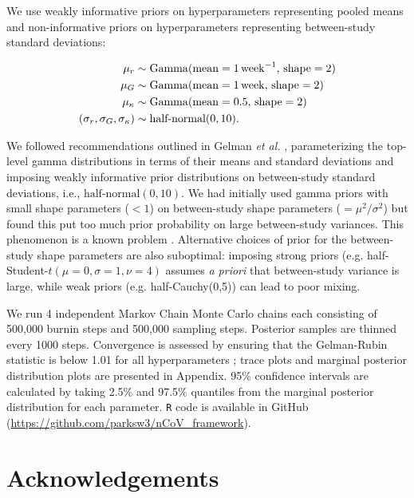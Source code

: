 \documentclass[12pt]{article}
\begin{document}
We use weakly informative priors on hyperparameters representing pooled means and non-informative priors on hyperparameters representing between-study standard deviations:
\begin{linenomath*}
\begin{equation}
\begin{aligned}
\mu_r &\sim \mathrm{Gamma}(\mathrm{mean}=1\,\mathrm{week}^{-1},\,\mathrm{shape}=2)\\
\mu_G &\sim \mathrm{Gamma}(\mathrm{mean}=1\,\mathrm{week},\,\mathrm{shape}=2)\\
\mu_\kappa &\sim \mathrm{Gamma}(\mathrm{mean}=0.5,\,\mathrm{shape}=2)\\
(\sigma_r, \sigma_G, \sigma_\kappa) &\sim \textrm{half-normal}(0, 10).
\end{aligned}
\end{equation}
\end{linenomath*}
We followed recommendations outlined in Gelman \textit{et al.} \cite{gelman2006prior}, parameterizing the top-level gamma distributions in terms of their means and standard deviations and imposing weakly informative prior distributions on between-study standard deviations, i.e., $\textrm{half-normal}(0, 10)$.
We had initially used gamma priors with small shape parameters ($< 1$) on between-study shape parameters ($=\mu^2/\sigma^2$) but found this put too much prior probability on large between-study variances. This phenomenon is a known problem \citep{gelman2006prior}.
Alternative choices of prior for the between-study shape parameters are also suboptimal: imposing strong priors (e.g. half-Student-$t(\mu=0,\sigma=1,\nu=4)$  assumes \textit{a priori} that between-study variance is large,  while weak priors (e.g. half-Cauchy(0,5)) can lead to poor mixing.

We run 4 independent Markov Chain Monte Carlo chains each consisting of 500,000 burnin steps and 500,000 sampling steps.
Posterior samples are thinned every 1000 steps.
Convergence is assessed by ensuring that the Gelman-Rubin statistic is below 1.01 for all hyperparameters \citep{gelman1992inference};
trace plots and marginal posterior distribution plots are presented in Appendix.
95\% confidence intervals are calculated by taking 2.5\% and 97.5\% quantiles from the marginal posterior distribution for each parameter.
\texttt{R} code is available in GitHub (\url{https://github.com/parksw3/nCoV_framework}).

\section*{Acknowledgements}
\end{document}
